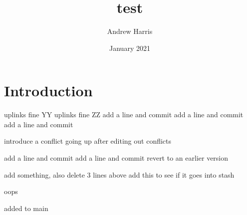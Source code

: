 \documentclass{article}
\title{test}
\author{Andrew Harris}
\date{January 2021}
\begin{document}
\maketitle

\section{Introduction}
uplinks fine YY
uplinks fine ZZ
add a line and commit
add a line and commit
add a line and commit

introduce a conflict going up
after editing out conflicts

add a line and commit
add a line and commit
revert to an earlier version

add something, also delete 3 lines above
add this to see if it goes into stash

oops

added to main
\end{document}
